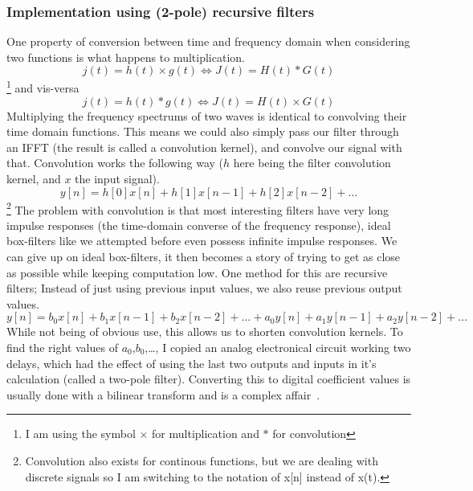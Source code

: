 \documentclass[11pt,a4paper]{article}
\begin{document}
\subsubsection{Implementation using (2-pole) recursive filters}

One property of conversion between time and frequency domain when considering two functions is what happens to multiplication.
\begin{equation}
j(t) = h(t) \times g(t) \iff J(t) = H(t) * G(t)
\end{equation}\footnote{I am using the symbol $\times$ for multiplication and $*$ for convolution}
and vis-versa
\begin{equation}
j(t) = h(t) * g(t) \iff J(t) = H(t) \times G(t)
\end{equation}
Multiplying the frequency spectrums of two waves is identical to convolving their time domain functions.
This means we could also simply pass our filter through an IFFT (the result is called a convolution kernel), and convolve our signal with that.
Convolution works the following way ($h$ here being the filter convolution kernel, and $x$ the input signal).
\begin{equation}
y[n] = h[0]x[n] + h[1]x[n-1] + h[2]x[n-2] + \dots
\end{equation}
\footnote{Convolution also exists for continous functions, but we are dealing with discrete signals so I am switching to the notation of x[n] instead of x(t).}
The problem with convolution is that most interesting filters have very long impulse responses (the time-domain converse of the frequency response), ideal box-filters like we attempted before even possess infinite impulse responses.
We can give up on ideal box-filters, it then becomes a story of trying to get as close as possible while keeping computation low. One method for this are recursive filters; Instead of just using previous input values, we also reuse previous output values.
\begin{equation}
y[n] = b_0x[n] + b_1x[n-1] + b_2x[n-2] + \dots + a_0y[n] + a_1y[n-1] + a_2y[n-2] + \dots
\end{equation}
While not being of obvious use, this allows us to shorten convolution kernels. To find the right values of $a_0$,$b_0$,\dots, I copied an analog electronical circuit working two delays, which had the effect of using the last two outputs and inputs in it's calculation (called a two-pole filter). Converting this to digital coefficient values is usually done with a bilinear transform and is a complex affair~\cite[chap. 3.5]{ZoranDFD}.
\end{document}
